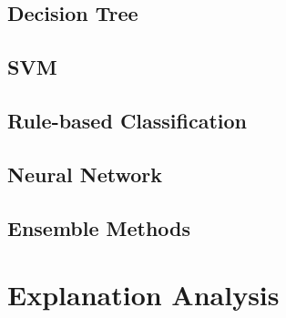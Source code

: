 \documentclass[10pt,a4paper]{report}
\begin{document}
\section{Decision Tree}
\section{SVM}
\section{Rule-based Classification}
\section{Neural Network}
\section{Ensemble Methods}

\chapter{Explanation Analysis}
\end{document}
